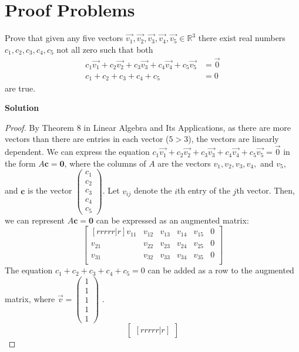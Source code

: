 \documentclass[11pt]{scrartcl}
\theoremstyle{dotlessP}
\theoremstyle{dotlessN}
\begin{document}
\section{Proof Problems}
\begin{ques}
	Prove that given any five vectors $\Vec{v_1}, \Vec{v_2}, \Vec{v_3}, \Vec{v_4}, \Vec{v_5} \in \mathbb{R}^3$ there exist real numbers $c_1,c_2,c_3,c_4,c_5$ not all zero such that both 
    \begin{align*}
		c_1\Vec{v_1} + c_2\Vec{v_2} + c_3\Vec{v_3} + c_4\Vec{v_4} + c_5\Vec{v_5} &= \Vec{0} \\
        c_1+c_2+c_3+c_4+c_5 &= 0
    \end{align*}
    are true.
\end{ques}
\textbf{Solution}
\begin{proof}
	By Theorem 8 in Linear Algebra and Its Applications, as there are more vectors than there are entries in each vector ($5 > 3$), the vectors are linearly dependent. We can express the equation $c_1\Vec{v_1} + c_2\Vec{v_2} + c_3\Vec{v_3} + c_4\Vec{v_4} + c_5\Vec{v_5} = \Vec{0}$ in the form  $A\bm{c} = \bm{0}$, where the columns of $A$ are the vectors $v_1, v_2, v_3, v_4,$ and $v_5$, and $\bm{c}$ is the vector $
	\begin{pmatrix}
		c_1 \\
		c_2 \\
		c_3 \\
		c_4 \\
		c_5
	\end{pmatrix}$. Let $v_{ij}$ denote the $i$th entry of the $j$th vector. Then, we can represent $A\bm{c} = \bm{0}$ can be expressed as an augmented matrix:
	\[
		\begin{bmatrix}[rrrrr|r]
		v_{11} & v_{12} & v_{13} & v_{14} & v_{15} & 0 \\
		v_{21} & v_{22} & v_{23} & v_{24} & v_{25} & 0 \\
		v_{31} & v_{32} & v_{33} & v_{34} & v_{35} & 0 \\
	\end{bmatrix}
	\] 
	The equation $c_1 + c_2 + c_3 + c_4 + c_5 = 0$ can be added as a row to the augmented matrix, where $\Vec{v} = 
	\begin{pmatrix}
		1 \\
		1 \\
		1 \\
		1 \\
		1
	\end{pmatrix}$ .
		\[
		\begin{bmatrix}[rrrrr|r]

\end{bmatrix}\]
\end{proof}
\end{document}
